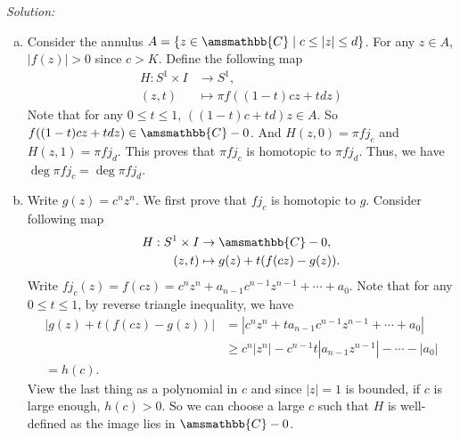 \documentclass[a4paper, 12pt]{article}
\newenvironment{solution}
    {\textit{Solution:}}
    {}
\renewcommand{\mathbb}{\amsmathbb}
\begin{document}
\begin{solution}
\begin{enumerate}[(a)]
\item Consider the annulus \(A=\left\{ z\in \mathbb{C}\mid c\leq |z|\leq d \right\}\). For any \(z\in A\), \(|f(z)|>0\) since \(c>K\). Define the following map 
\begin{align*}
	H:S^1\times I&\rightarrow S^1,\\ 
	(z,t)&\mapsto \pi f((1-t)cz+tdz)
\end{align*}
Note that for any \(0\leq t\leq 1\), \(((1-t)c+td)z\in A\). So \(f((1-t)cz+tdz)\in \mathbb{C}-0\). And \(H(z,0)=\pi fj_c\) and \(H(z,1)=\pi fj_d\). This proves that \(\pi fj_c\) is homotopic to 
\(\pi fj_d\). Thus, we have \(\deg \pi fj_c=\deg \pi fj_d\). 
\item Write \(g(z)=c^nz^n\). We first prove that \(fj_c\) is homotopic to \(g\). Consider following map 
\begin{align*}
	H:S^1\times I&\rightarrow \mathbb{C}-0,\\ 
	(z,t)&\mapsto g(z)+t(f(cz)-g(z)).
\end{align*}
Write \(fj_c(z)=f(cz)=c^nz^n+a_{n-1}c^{n-1}z^{n-1}+\cdots+a_0\). Note that for any \(0\leq t\leq 1\), by reverse triangle inequality, we have 
\begin{align*}
	|g(z)+t(f(cz)-g(z))|&=|c^nz^n+ta_{n-1}c^{n-1}z^{n-1}+\cdots+a_0|\\ 
	                    &\geq c^n|z^n|-c^{n-1}t|a_{n-1}z^{n-1}|-\cdots-|a_0|\\ 
						=h(c).
\end{align*}
View the last thing as a polynomial in \(c\) and since \(|z|=1\) is bounded, if \(c\) is large enough, \(h(c)>0\). So we can choose a large \(c\) such that \(H\) is well-defined as the image lies in 
\(\mathbb{C}-0\). 


\end{enumerate}
\end{solution}
\end{document}

